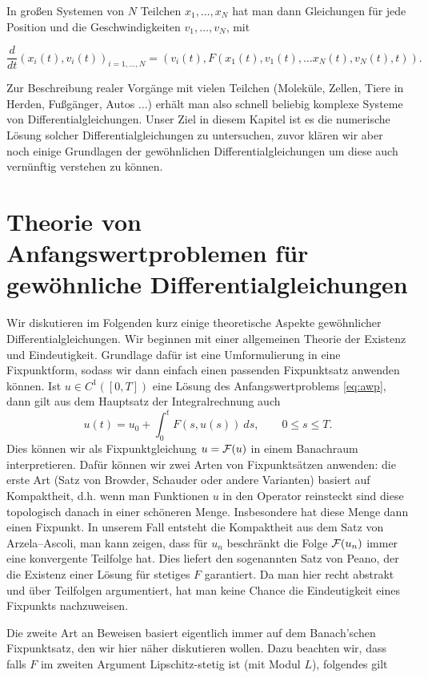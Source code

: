 In großen Systemen von $N$ Teilchen $x_1,\ldots,x_N$ hat man dann Gleichungen für jede Position und die Geschwindigkeiten $v_1,\ldots,v_N$, mit

\begin{equation*} 
\frac{d}{dt} (x_i(t),v_i(t))_{i=1,\ldots,N} = (v_i(t), F(x_1(t),v_1(t), \ldots x_N(t),v_N(t),t)).
\end{equation*}

Zur Beschreibung realer Vorgänge mit vielen Teilchen (Moleküle, Zellen, Tiere in Herden, Fußgänger, Autos ...) erhält man also schnell beliebig komplexe Systeme von Differentialgleichungen. Unser Ziel in diesem Kapitel ist es die numerische Lösung solcher Differentialgleichungen zu untersuchen, zuvor klären wir aber noch einige Grundlagen der gewöhnlichen Differentialgleichungen um diese auch vernünftig verstehen zu können.


\section{Theorie von Anfangswertproblemen für gewöhnliche Differentialgleichungen}

Wir diskutieren im Folgenden kurz einige theoretische Aspekte gewöhnlicher Differentialgleichungen. Wir beginnen mit einer allgemeinen Theorie der Existenz und Eindeutigkeit. Grundlage dafür ist eine Umformulierung in eine Fixpunktform, sodass wir dann einfach einen passenden Fixpunktsatz anwenden können. Ist $u \in C^1([0,T])$ eine Lösung des Anfangswertproblems \eqref{eq:awp}, dann gilt aus dem Hauptsatz der Integralrechnung auch
$$ u(t) = u_0 + \int_0^t F(s,u(s)) ~ds , \qquad 0 \leq s \leq T. $$
Dies können wir als Fixpunktgleichung $u= {\cal F}(u)$  in einem Banachraum interpretieren. Dafür können wir zwei Arten von Fixpunktsätzen anwenden: die erste Art (Satz von Browder, Schauder oder andere Varianten) basiert auf Kompaktheit, d.h. wenn man Funktionen $u$ in den Operator reinsteckt sind diese topologisch danach in einer schöneren Menge. Insbesondere hat diese Menge dann einen Fixpunkt. In unserem Fall entsteht die Kompaktheit aus dem Satz von Arzela--Ascoli, man kann zeigen, dass für $u_n$ beschränkt die Folge ${\cal F}(u_n)$ immer eine konvergente Teilfolge hat. Dies liefert den sogenannten Satz von Peano, der die Existenz einer Lösung für stetiges $F$ garantiert. Da man hier recht abstrakt und über Teilfolgen argumentiert, hat man keine Chance die Eindeutigkeit eines Fixpunkts nachzuweisen. 

Die zweite Art an Beweisen basiert eigentlich immer auf dem Banach'schen Fixpunktsatz, den wir hier näher diskutieren wollen. Dazu beachten wir, dass falls $F$ im zweiten Argument Lipschitz-stetig ist (mit Modul $L$), folgendes gilt 

